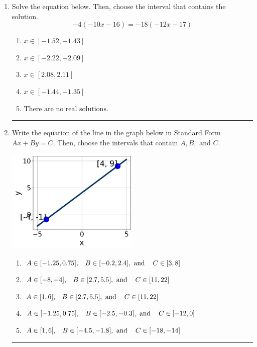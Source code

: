 \documentclass[14pt]{extbook}
\newcommand{\litem}[1]{\item#1\hspace*{-1cm}\rule{\textwidth}{0.4pt}}
\begin{document}
\begin{enumerate}
\litem{
Solve the equation below. Then, choose the interval that contains the solution.\[ -4(-10x -16) = -18(-12x -17) \]\begin{enumerate}[label=\Alph*.]
\item \( x \in [-1.52, -1.43] \)
\item \( x \in [-2.22, -2.09] \)
\item \( x \in [2.08, 2.11] \)
\item \( x \in [-1.44, -1.35] \)
\item \( \text{There are no real solutions.} \)

\end{enumerate} }
\litem{
Write the equation of the line in the graph below in Standard Form $Ax+By=C$. Then, choose the intervals that contain $A, B, \text{ and } C$.
\begin{center}
    \includegraphics[width=0.5\textwidth]{../Figures/linearGraphToStandardCopyB.png}
\end{center}
\begin{enumerate}[label=\Alph*.]
\item \( A \in [-1.25, 0.75], \hspace{3mm} B \in [-0.2, 2.4], \text{ and } \hspace{3mm} C \in [3, 8] \)
\item \( A \in [-8, -4], \hspace{3mm} B \in [2.7, 5.5], \text{ and } \hspace{3mm} C \in [11, 22] \)
\item \( A \in [1, 6], \hspace{3mm} B \in [2.7, 5.5], \text{ and } \hspace{3mm} C \in [11, 22] \)
\item \( A \in [-1.25, 0.75], \hspace{3mm} B \in [-2.5, -0.3], \text{ and } \hspace{3mm} C \in [-12, 0] \)
\item \( A \in [1, 6], \hspace{3mm} B \in [-4.5, -1.8], \text{ and } \hspace{3mm} C \in [-18, -14] \)


\end{enumerate}}
\end{enumerate}
\end{document}
